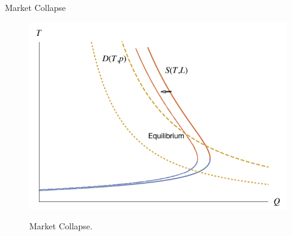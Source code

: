    \begin{frame}{Market Collapse}
        \begin{figure}
            \centering
            {\includegraphics[scale=0.30]{plots/market_collapse_1.png}}
            \caption{Market Collapse.}
        \end{figure}
    \end{frame}

